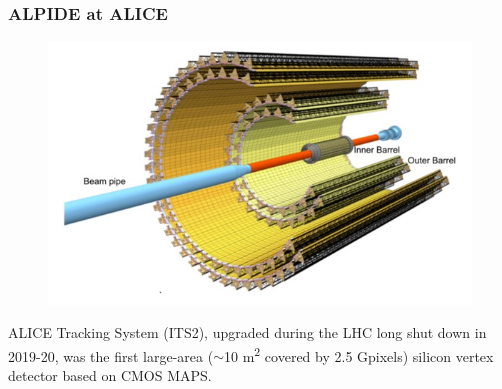        \subsubsection{ALPIDE at ALICE}
        \begin{figure}[h!]
            \centering
            \includegraphics[width=.7\linewidth]{figures/pixel_detectors_usage/alice.png}
            \caption{}
            \label{fig:}
        \end{figure}
        ALICE Tracking System (ITS2), upgraded during the LHC long shut down in 2019-20, was the first large-area ($\sim$10 \si{m\squared} covered by 2.5 Gpixels) silicon vertex detector based on CMOS MAPS.

